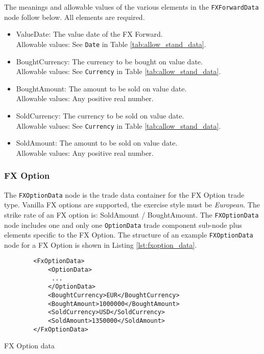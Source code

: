 The meanings and allowable values of the various elements in the \lstinline!FXForwardData!  node follow below.  All elements are required.

\begin{itemize}
\item ValueDate: The value date of the FX Forward. \\ Allowable values:  See \lstinline!Date! in Table \ref{tab:allow_stand_data}.
\item BoughtCurrency: The currency to be bought on value date.  \\ Allowable values:  See \lstinline!Currency! in Table \ref{tab:allow_stand_data}.
\item BoughtAmount: The amount to be sold on value date.  \\ Allowable values:  Any positive real number.
\item SoldCurrency: The currency to be sold on value date.  \\ Allowable values:  See \lstinline!Currency! in Table \ref{tab:allow_stand_data}.
\item SoldAmount: The amount to be sold on value date.  \\ Allowable values:  Any positive real number.

\end{itemize}


\subsubsection{FX Option}

The \lstinline!FXOptionData!  node is the trade data container for the FX Option trade type.  Vanilla FX options are
supported, the exercise style must be \emph{European}. The strike rate of an FX option is: SoldAmount / BoughtAmount. The
\lstinline!FXOptionData!  node includes one and only one \lstinline!OptionData! trade component sub-node plus elements
specific to the FX Option. The structure of an example \lstinline!FXOptionData! node for a FX Option is shown in Listing
\ref{lst:fxoption_data}.

\begin{listing}[H]
\begin{verbatim}
        <FxOptionData>
            <OptionData>
             ...
            </OptionData>
            <BoughtCurrency>EUR</BoughtCurrency>
            <BoughtAmount>1000000</BoughtAmount>
            <SoldCurrency>USD</SoldCurrency>
            <SoldAmount>1350000</SoldAmount>
        </FxOptionData>
\end{verbatim}
\caption{FX Option data}
\label{lst:fxoption_data}
\end{listing}

